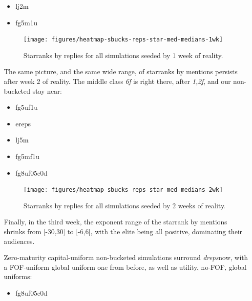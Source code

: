 \documentclass[10pt,oneside]{memoir}
\begin{document}
\begin{Spacing}{2}
\begin{itemize}
\item lj2m

\item fg5m1u
\end{itemize}


\begin{figure}
\begin{center}
    \texttt{[image: figures/heatmap-sbucks-reps-star-med-medians-1wk]}
    \caption{Starranks by replies for all simulations seeded by 1 week of reality.}
    \label{figure:heatmap-sbucks-reps-star-med-medians-1wk}
\end{center}
\end{figure}
The same picture, and the same wide range, of starranks by mentions persists after week 2 of reality.  The middle class {\itshape 6f} is right there, after {\itshape {1,2}f}, and our non-bucketed stay near:


\begin{itemize}


\item fg5uf1u

\item ereps

\item lj5m

\item fg5mf1u

\item fg8uf05c0d
\end{itemize}


\begin{figure}
\begin{center}
    \texttt{[image: figures/heatmap-sbucks-reps-star-med-medians-2wk]}
    \caption{Starranks by replies for all simulations seeded by 2 weeks of reality.}
    \label{figure:heatmap-sbucks-reps-star-med-medians-2wk}
\end{center}
\end{figure}
Finally, in the third week, the exponent range of the starrank by mentions shrinks from [-30,30] to [-6,6], with the elite being all positive, dominating their audiences.


Zero-maturity capital-uniform non-bucketed simulations surround {\itshape dreps}now, with a FOF-uniform global uniform one from before, as well as utility, no-FOF, global uniforms:


\begin{itemize}


\item fg8uf05c0d


\end{itemize}
\end{Spacing}
\end{document}
